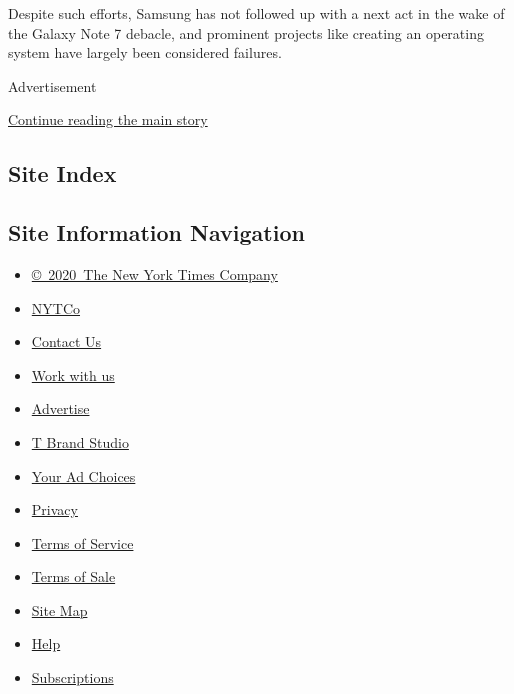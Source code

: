 Despite such efforts, Samsung has not followed up with a next act in the
wake of the Galaxy Note 7 debacle, and prominent projects like creating
an operating system have largely been considered failures.

Advertisement

\protect\hyperlink{after-bottom}{Continue reading the main story}

\hypertarget{site-index}{%
\subsection{Site Index}\label{site-index}}

\hypertarget{site-information-navigation}{%
\subsection{Site Information
Navigation}\label{site-information-navigation}}

\begin{itemize}
\tightlist
\item
  \href{https://help.nytimes3xbfgragh.onion/hc/en-us/articles/115014792127-Copyright-notice}{©~2020~The
  New York Times Company}
\end{itemize}

\begin{itemize}
\tightlist
\item
  \href{https://www.nytco.com/}{NYTCo}
\item
  \href{https://help.nytimes3xbfgragh.onion/hc/en-us/articles/115015385887-Contact-Us}{Contact
  Us}
\item
  \href{https://www.nytco.com/careers/}{Work with us}
\item
  \href{https://nytmediakit.com/}{Advertise}
\item
  \href{http://www.tbrandstudio.com/}{T Brand Studio}
\item
  \href{https://www.nytimes3xbfgragh.onion/privacy/cookie-policy\#how-do-i-manage-trackers}{Your
  Ad Choices}
\item
  \href{https://www.nytimes3xbfgragh.onion/privacy}{Privacy}
\item
  \href{https://help.nytimes3xbfgragh.onion/hc/en-us/articles/115014893428-Terms-of-service}{Terms
  of Service}
\item
  \href{https://help.nytimes3xbfgragh.onion/hc/en-us/articles/115014893968-Terms-of-sale}{Terms
  of Sale}
\item
  \href{https://spiderbites.nytimes3xbfgragh.onion}{Site Map}
\item
  \href{https://help.nytimes3xbfgragh.onion/hc/en-us}{Help}
\item
  \href{https://www.nytimes3xbfgragh.onion/subscription?campaignId=37WXW}{Subscriptions}
\end{itemize}
